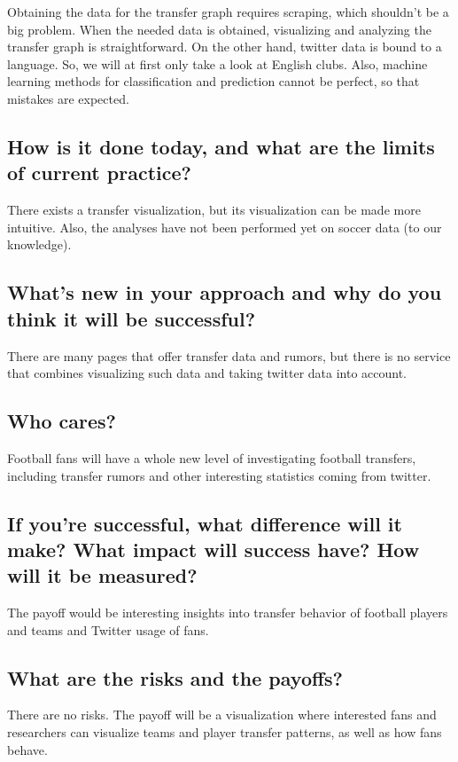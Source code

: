 \documentclass{article}
\begin{document}
Obtaining the data for the transfer graph requires scraping, which shouldn't be a big problem. When the needed data is obtained, visualizing and analyzing the transfer graph is straightforward. On the other hand, twitter data is bound to a language. So, we will at first only take a look at English clubs. Also, machine learning methods for classification and prediction cannot be perfect, so that mistakes are expected. 

\subsection{How is it done today, and what are the limits of current practice?}
There exists a transfer visualization, but its visualization can be made more intuitive.
Also, the analyses have not been performed yet on soccer data (to our knowledge).

\subsection{What's new in your approach and why do you think it will be successful?}
There are many pages that offer transfer data and rumors, but there is no service that combines visualizing such data and taking twitter data into account. 

\subsection{Who cares?}
Football fans will have a whole new level of investigating football transfers, including transfer rumors and other interesting statistics coming from twitter.

\subsection{If you're successful, what difference will it make? What impact will success have? How will it be measured?}
\label{sec:difference_impact}
The payoff would be interesting insights into transfer behavior of football players and teams and Twitter usage of fans. 

\subsection{What are the risks and the payoffs?}
There are no risks. The payoff will be a visualization where interested fans and researchers can visualize teams and player transfer patterns, as well as how fans behave. 
\end{document}
